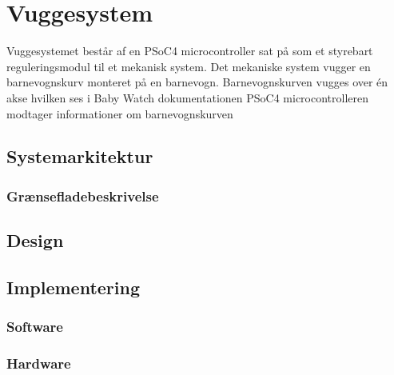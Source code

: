 \chapter{Vuggesystem}\label{vuggesys}
Vuggesystemet består af en PSoC4 microcontroller sat på som et styrebart reguleringsmodul til et mekanisk system. Det mekaniske system vugger en barnevognskurv monteret på en barnevogn. Barnevognskurven vugges over én akse hvilken ses i Baby Watch dokumentationen  PSoC4 microcontrolleren modtager informationer om barnevognskurven 







\section{Systemarkitektur}
\label{vs_sysark}


\subsection{Grænsefladebeskrivelse}


\section{Design}
\label{vs_design}




\section{Implementering}
\label{vs_implementering}



\subsection*{Software}
\label{vs_implementering_sw}


\subsection*{Hardware}
\label{vs_implementering_sw}
